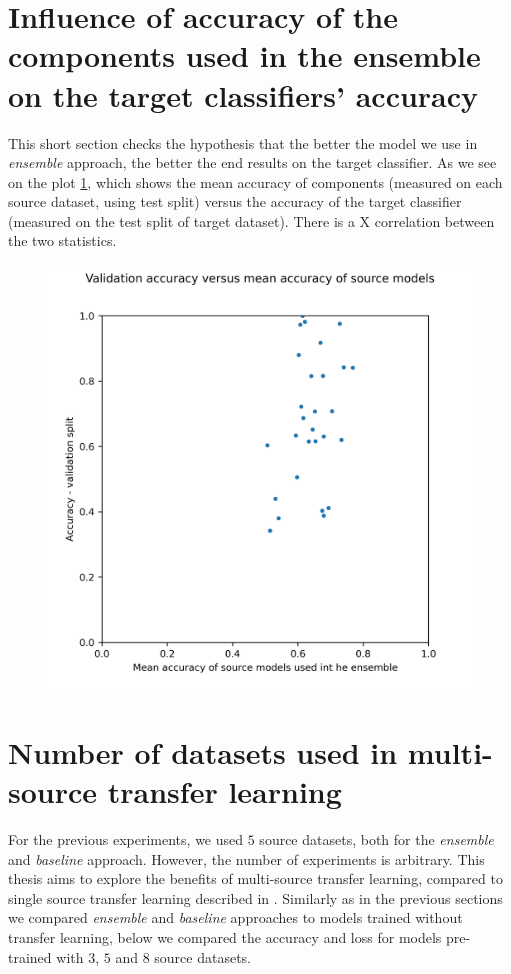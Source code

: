 \documentclass[a4paper,11pt,twoside]{report}
\theoremstyle{definition}
\begin{document}
\section{Influence of accuracy of the components used in the ensemble on the target classifiers' accuracy}
This short section checks the hypothesis that the better the model we use in \textit{ensemble} approach, the better the end results on the target classifier. As we see on the plot \ref{fig:acc_source_vs_acc_target}, which shows the mean accuracy of components (measured on each source dataset, using test split) versus the accuracy of the target classifier (measured on the test split of target dataset). There is a X correlation between the two statistics.
\FloatBarrier
\begin{figure}[h!t]
\centering
\includegraphics[width=17cm]{imgs/ensemble/source_acc_vs_val.png}
\caption{}
\label{fig:acc_source_vs_acc_target}
\end{figure}
\FloatBarrier
\section{Number of datasets used in multi-source transfer learning}
For the previous experiments, we used $5$ source datasets, both for the \textit{ensemble} and \textit{baseline} approach. However, the number of experiments is arbitrary. This thesis aims to explore the benefits of multi-source transfer learning, compared to single source transfer learning described in \cite{transfer_learning_time_series}. Similarly as in the previous sections we compared \textit{ensemble} and \textit{baseline} approaches to models trained without transfer learning, below we compared the accuracy and loss for models pre-trained with $3$, $5$ and $8$ source datasets.
\end{document}
